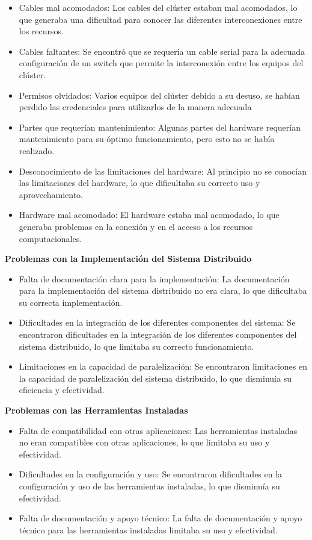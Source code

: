 \begin{spacing}{1.5}
    \begin{itemize}
        \item Cables mal acomodados: Los cables del clúster estaban mal acomodados, lo que generaba una dificultad para conocer las diferentes interconexiones entre los recursos.
        \item Cables faltantes: Se encontró que se requería un cable serial para la adecuada configuración de un switch que permite la interconexión entre los equipos del clúster.
        \item Permisos olvidados: Varios equipos del clúster debido a su desuso, se habían perdido las credenciales para utilizarlos de la manera adecuada
        \item Partes que requerían mantenimiento: Algunas partes del hardware requerían mantenimiento para su óptimo funcionamiento, pero esto no se había realizado.
        \item Desconocimiento de las limitaciones del hardware: Al principio no se conocían las limitaciones del hardware, lo que dificultaba su correcto uso y aprovechamiento.
        \item Hardware mal acomodado: El hardware estaba mal acomodado, lo que generaba problemas en la conexión y en el acceso a los recursos computacionales.
    \end{itemize}

    \textbf{Problemas con la Implementación del Sistema Distribuido}

    \begin{itemize}
        \item Falta de documentación clara para la implementación: La documentación para la implementación del sistema distribuido no era clara, lo que dificultaba su correcta implementación.
        \item Dificultades en la integración de los diferentes componentes del sistema: Se encontraron dificultades en la integración de los diferentes componentes del sistema distribuido, lo que limitaba su correcto funcionamiento.
        \item Limitaciones en la capacidad de paralelización: Se encontraron limitaciones en la capacidad de paralelización del sistema distribuido, lo que disminuía su eficiencia y efectividad.
    \end{itemize}

    \textbf{Problemas con las Herramientas Instaladas}

    \begin{itemize}
        \item Falta de compatibilidad con otras aplicaciones: Las herramientas instaladas no eran compatibles con otras aplicaciones, lo que limitaba su uso y efectividad.
        \item Dificultades en la configuración y uso: Se encontraron dificultades en la configuración y uso de las herramientas instaladas, lo que disminuía su efectividad.
        \item Falta de documentación y apoyo técnico: La falta de documentación y apoyo técnico para las herramientas instaladas limitaba su uso y efectividad.
    \end{itemize}


\end{spacing}
